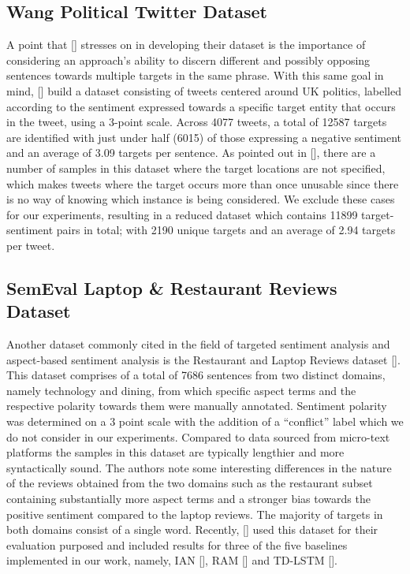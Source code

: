 \documentclass[12pt, a4paper]{report}
\theoremstyle{definition}
\theoremstyle{definition}%
\theoremstyle{definition}%
\theoremstyle{definition}%
\theoremstyle{definition}%
\theoremstyle{definition}%
\renewcommand{\cite}[1]{[\citealp{#1}]}
\begin{document}
\subsection{Wang Political Twitter Dataset}
A point that \cite{saeidi2016} stresses on in developing their dataset is the importance of considering an approach's ability to discern different and possibly opposing sentences towards multiple targets in the same phrase. With this same goal in mind, \cite{wang2017} build a dataset consisting of tweets centered around UK politics, labelled according to the sentiment expressed towards a specific target entity that occurs in the tweet, using a 3-point scale. Across 4077 tweets, a total of 12587 targets are identified with just under half (6015) of those expressing a negative sentiment and an average of 3.09 targets per sentence. As pointed out in \cite{moore2018}, there are a number of samples in this dataset where the target locations are not specified, which makes tweets where the target occurs more than once unusable since there is no way of knowing which instance is being considered. We exclude these cases for our experiments, resulting in a reduced dataset which contains 11899 target-sentiment pairs in total; with 2190 unique targets and an average of 2.94 targets per tweet.

\subsection{SemEval Laptop \& Restaurant Reviews Dataset}
Another dataset commonly cited in the field of targeted sentiment analysis and aspect-based sentiment analysis is the Restaurant and Laptop Reviews dataset \cite{pontiki}. This dataset comprises of a total of 7686 sentences from two distinct domains, namely technology and dining, from which specific aspect terms and the respective polarity towards them were manually annotated. Sentiment polarity was determined on a 3 point scale with the addition of a \enquote{conflict} label which we do not consider in our experiments. Compared to data sourced from micro-text platforms the samples in this dataset are typically lengthier and more syntactically sound. The authors note some interesting differences in the nature of the reviews obtained from the two domains such as the restaurant subset containing substantially more aspect terms and a stronger bias towards the positive sentiment compared to the laptop reviews. The majority of targets in both domains consist of a single word. Recently, \cite{xue2018} used this dataset for their evaluation purposed and included results for three of the five baselines implemented in our work, namely, IAN \cite{dehongma2017}, RAM \cite{chen2017} and TD-LSTM \cite{tang2016b}.
\end{document}
